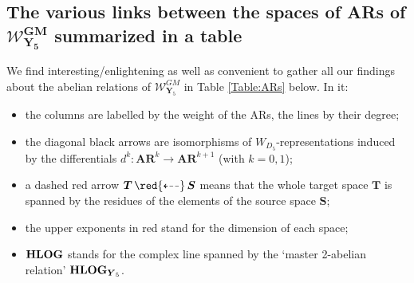 \documentclass[11pt]{amsart}
\newcommand{\sk}{\smallskip}
\begin{document}
\subsection{\bf The various links between the spaces of ARs of $\boldsymbol{{\mathcal W}^{GM}_{ {Y}_5}}$ summarized in a table}
\label{SS:pictural}
%
%
We find interesting/enlightening as well as convenient to gather all our findings about the abelian relations of $\boldsymbol{\mathcal W}^{GM}_{\boldsymbol{Y}_5}$ in Table \ref{Table:ARs} below. In it: 
\begin{itemize}%
\item[$-$]  the columns are labelled by the weight of the ARs, the lines by their degree; 
\sk
\item[$-$] the diagonal black arrows are isomorphisms of $W_{D_5}$-representations induced by the differentials $d^k: \boldsymbol{AR}^{k}
\rightarrow \boldsymbol{AR}^{k+1}$ (with $k=0,1$);
\sk
\item[$-$] a dashed red arrow $\boldsymbol{T}\,{\red{\dashleftarrow}}\,\boldsymbol{S}$ means that the whole target space $\boldsymbol{T}$ is 
spanned by  the residues of the elements of the source space $\boldsymbol{S}$;
\sk
\item[$-$] the upper exponents in red stand for the dimension of each space;
\sk
\item[$-$] ${\bf HLOG}$ stands for the complex line spanned by the `master 2-abelian relation' ${\bf HLOG}_{\boldsymbol{Y}_5}$.
\sk
\end{itemize}%
\end{document}
